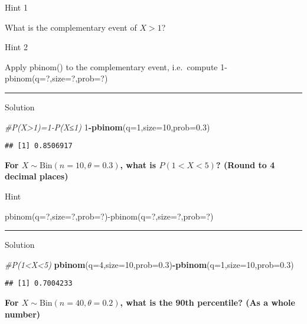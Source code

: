\documentclass[
]{book}
\newenvironment{Shaded}{\begin{snugshade}}{\end{snugshade}}
\newcommand{\AttributeTok}[1]{\textcolor[rgb]{0.13,0.29,0.53}{#1}}
\newcommand{\CommentTok}[1]{\textcolor[rgb]{0.56,0.35,0.01}{\textit{#1}}}
\newcommand{\DecValTok}[1]{\textcolor[rgb]{0.00,0.00,0.81}{#1}}
\newcommand{\FloatTok}[1]{\textcolor[rgb]{0.00,0.00,0.81}{#1}}
\newcommand{\FunctionTok}[1]{\textcolor[rgb]{0.13,0.29,0.53}{\textbf{#1}}}
\newcommand{\NormalTok}[1]{#1}
\newcommand{\SpecialCharTok}[1]{\textcolor[rgb]{0.81,0.36,0.00}{\textbf{#1}}}
\begin{document}
Hint 1

What is the complementary event of \(X>1\)?

Hint 2

Apply pbinom() to the complementary event, i.e.~compute
1-pbinom(q=?,size=?,prob=?)

\begin{center}\rule{0.5\linewidth}{0.5pt}\end{center}

Solution

\begin{Shaded}
\begin{Highlighting}[]
\CommentTok{\#P(X\textgreater{}1)=1{-}P(X≤1)}
\DecValTok{1}\SpecialCharTok{{-}}\FunctionTok{pbinom}\NormalTok{(}\AttributeTok{q=}\DecValTok{1}\NormalTok{,}\AttributeTok{size=}\DecValTok{10}\NormalTok{,}\AttributeTok{prob=}\FloatTok{0.3}\NormalTok{)}
\end{Highlighting}
\end{Shaded}

\begin{verbatim}
## [1] 0.8506917
\end{verbatim}

\textbf{For \(X \sim \mbox{Bin}(n=10,\theta=0.3)\), what is \(P(1<X<5)\)? (Round to 4 decimal places)}

Hint

pbinom(q=?,size=?,prob=?)-pbinom(q=?,size=?,prob=?)

\begin{center}\rule{0.5\linewidth}{0.5pt}\end{center}

Solution

\begin{Shaded}
\begin{Highlighting}[]
\CommentTok{\#P(1\textless{}X\textless{}5)}
\FunctionTok{pbinom}\NormalTok{(}\AttributeTok{q=}\DecValTok{4}\NormalTok{,}\AttributeTok{size=}\DecValTok{10}\NormalTok{,}\AttributeTok{prob=}\FloatTok{0.3}\NormalTok{)}\SpecialCharTok{{-}}\FunctionTok{pbinom}\NormalTok{(}\AttributeTok{q=}\DecValTok{1}\NormalTok{,}\AttributeTok{size=}\DecValTok{10}\NormalTok{,}\AttributeTok{prob=}\FloatTok{0.3}\NormalTok{)}
\end{Highlighting}
\end{Shaded}

\begin{verbatim}
## [1] 0.7004233
\end{verbatim}

\textbf{For \(X \sim \mbox{Bin}(n=40,\theta=0.2)\), what is the 90th percentile? (As a whole number)}
\end{document}
